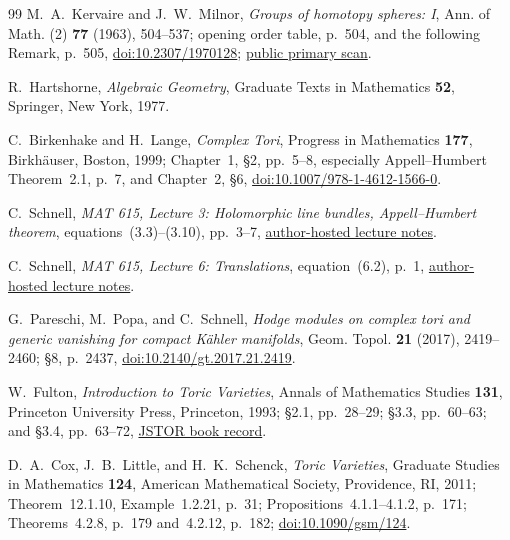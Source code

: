 \begin{thebibliography}{99}
M.~A.~Kervaire and J.~W.~Milnor,
\emph{Groups of homotopy spheres: I},
Ann. of Math. (2) \textbf{77} (1963), 504--537; opening order table,
p.~504, and the following Remark, p.~505,
\href{https://doi.org/10.2307/1970128}{doi:10.2307/1970128};
\href{https://www.sas.rochester.edu/mth/sites/doug-ravenel/otherpapers/kervaire-milnor.pdf}%
{public primary scan}.

R.~Hartshorne,
\emph{Algebraic Geometry},
Graduate Texts in Mathematics \textbf{52}, Springer, New York, 1977.

C.~Birkenhake and H.~Lange,
\emph{Complex Tori},
Progress in Mathematics \textbf{177}, Birkh\"auser, Boston, 1999;
Chapter~1, \S2, pp.~5--8, especially Appell--Humbert Theorem~2.1,
p.~7, and Chapter~2, \S6,
\href{https://doi.org/10.1007/978-1-4612-1566-0}{doi:10.1007/978-1-4612-1566-0}.

C.~Schnell,
\emph{MAT 615, Lecture 3: Holomorphic line bundles,
Appell--Humbert theorem},
equations~(3.3)--(3.10), pp.~3--7,
\href{https://www.math.stonybrook.edu/~cschnell/mat615/lectures/lecture3.pdf}%
{author-hosted lecture notes}.

C.~Schnell,
\emph{MAT 615, Lecture 6: Translations},
equation~(6.2), p.~1,
\href{https://www.math.stonybrook.edu/~cschnell/mat615/lectures/lecture6.pdf}%
{author-hosted lecture notes}.

G.~Pareschi, M.~Popa, and C.~Schnell,
\emph{Hodge modules on complex tori and generic vanishing for compact
K\"ahler manifolds},
Geom. Topol. \textbf{21} (2017), 2419--2460; \S8, p.~2437,
\href{https://doi.org/10.2140/gt.2017.21.2419}{doi:10.2140/gt.2017.21.2419}.

W.~Fulton,
\emph{Introduction to Toric Varieties},
Annals of Mathematics Studies \textbf{131}, Princeton University Press,
Princeton, 1993; \S2.1, pp.~28--29; \S3.3, pp.~60--63; and \S3.4,
pp.~63--72,
\href{https://www.jstor.org/stable/j.ctt1b7x7vc}{JSTOR book record}.

D.~A.~Cox, J.~B.~Little, and H.~K.~Schenck,
\emph{Toric Varieties},
Graduate Studies in Mathematics \textbf{124}, American Mathematical Society,
Providence, RI, 2011; Theorem~12.1.10,
Example~1.2.21, p.~31; Propositions~4.1.1--4.1.2, p.~171;
Theorems~4.2.8, p.~179 and~4.2.12, p.~182;
\href{https://doi.org/10.1090/gsm/124}{doi:10.1090/gsm/124}.


\end{thebibliography}

